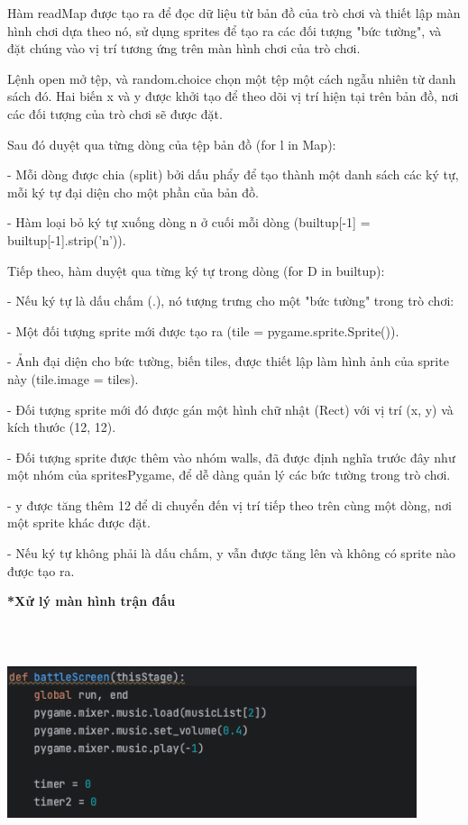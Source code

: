 \documentclass[a4paper]{article}
\begin{document}
        Hàm readMap được tạo ra để đọc dữ liệu từ bản đồ của trò chơi và thiết lập màn hình chơi dựa theo nó, sử dụng sprites để tạo ra các đối tượng "bức tường", và đặt chúng vào vị trí tương ứng trên màn hình chơi của trò chơi.

        Lệnh open mở tệp, và random.choice chọn một tệp một cách ngẫu nhiên từ danh sách đó. Hai biến x và y được khởi tạo để theo dõi vị trí hiện tại trên bản đồ, nơi các đối tượng của trò chơi sẽ được đặt.
        
        Sau đó duyệt qua từng dòng của tệp bản đồ (for l in Map):
        
        - Mỗi dòng được chia (split) bởi dấu phẩy để tạo thành một danh sách các ký tự, mỗi ký tự đại diện cho một phần của bản đồ.
        
        - Hàm loại bỏ ký tự xuống dòng n ở cuối mỗi dòng (builtup[-1] = builtup[-1].strip('n')).
        
        Tiếp theo, hàm duyệt qua từng ký tự trong dòng (for D in builtup):
        
        - Nếu ký tự là dấu chấm (.), nó tượng trưng cho một "bức tường" trong trò chơi:
        
        - Một đối tượng sprite mới được tạo ra (tile = pygame.sprite.Sprite()).
        
        - Ảnh đại diện cho bức tường, biến tiles, được thiết lập làm hình ảnh của sprite này (tile.image = tiles).
        
        - Đối tượng sprite mới đó được gán một hình chữ nhật (Rect) với vị trí (x, y) và kích thước (12, 12).

        - Đối tượng sprite được thêm vào nhóm walls, đã được định nghĩa trước đây như một nhóm của spritesPygame, để dễ dàng quản lý các bức tường trong trò chơi.
    
        - y được tăng thêm 12 để di chuyển đến vị trí tiếp theo trên cùng một dòng, nơi một sprite khác được đặt.
        
        - Nếu ký tự không phải là dấu chấm, y vẫn được tăng lên và không có sprite nào được tạo ra.
        
         \textbf{*Xử lý màn hình trận đấu}

         \includegraphics[width=12cm,height=7cm]{battleSreen.png}
\end{document}
